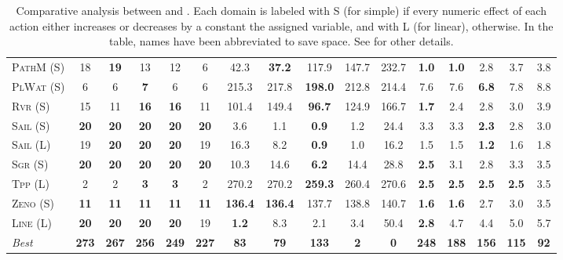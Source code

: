 \documentclass[11pt,landscape]{article}
\begin{document}
\begin{table*}[tb]
{\begin{tabular}{|l||ccccc||ccccc||ccccc||}
\textsc{PathM} (S)&18&\textbf{19}&13&12&6&42.3&\textbf{37.2}&117.9&147.7&232.7&\textbf{1.0}&\textbf{1.0}&2.8&3.7&3.8\\
\textsc{PlWat} (S)&6&6&\textbf{7}&6&6&215.3&217.8&\textbf{198.0}&212.8&214.4&7.6&7.6&\textbf{6.8}&7.8&8.8\\
\textsc{Rvr} (S)&15&11&\textbf{16}&\textbf{16}&11&101.4&149.4&\textbf{96.7}&124.9&166.7&\textbf{1.7}&2.4&2.8&3.0&3.9\\
\textsc{Sail} (S)&\textbf{20}&\textbf{20}&\textbf{20}&\textbf{20}&\textbf{20}&3.6&1.1&\textbf{0.9}&1.2&24.4&3.3&3.3&\textbf{2.3}&2.8&3.0\\
\textsc{Sail} (L)&19&\textbf{20}&\textbf{20}&\textbf{20}&19&16.3&8.2&\textbf{0.9}&1.0&16.2&1.5&1.5&\textbf{1.2}&1.6&1.8\\
\textsc{Sgr} (S)&\textbf{20}&\textbf{20}&\textbf{20}&\textbf{20}&\textbf{20}&10.3&14.6&\textbf{6.2}&14.4&28.8&\textbf{2.5}&3.1&2.8&3.3&3.5\\
\textsc{Tpp} (L)&2&2&\textbf{3}&\textbf{3}&2&270.2&270.2&\textbf{259.3}&260.4&270.6&\textbf{2.5}&\textbf{2.5}&\textbf{2.5}&\textbf{2.5}&3.5\\
\textsc{Zeno} (S)&\textbf{11}&\textbf{11}&\textbf{11}&\textbf{11}&\textbf{11}&\textbf{136.4}&\textbf{136.4}&137.7&138.8&140.7&\textbf{1.6}&\textbf{1.6}&2.7&3.0&3.5\\
\textsc{Line} (L)&\textbf{20}&\textbf{20}&\textbf{20}&\textbf{20}&19&\textbf{1.2}&8.3&2.1&3.4&50.4&\textbf{2.8}&4.7&4.4&5.0&5.7
\\\hline
\textit{Best}&\textbf{273}&\textbf{267}&\textbf{256}&\textbf{249}&\textbf{227}&\textbf{83}&\textbf{79}&\textbf{133}&\textbf{2}&\textbf{0}&\textbf{248}&\textbf{188}&\textbf{156}&\textbf{115}&\textbf{92}\\\hline

        \end{tabular}}
        \caption{Comparative analysis between  \pattya and \pattye. Each domain is labeled with S (for simple) if every numeric effect of each action either increases or decreases by a constant the assigned variable, and with L (for linear), otherwise. In the table, names have been abbreviated to save space.  See \cite{ipc2023} for other details.}
        \label{tab:exp-patty-a-patty-e}
        \end{table*}
        
\end{document}
